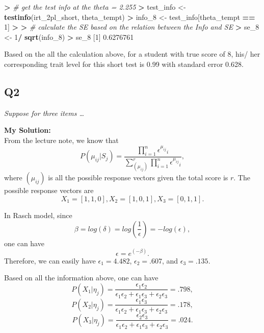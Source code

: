 \documentclass[
]{article}
\newenvironment{Shaded}{\begin{snugshade}}{\end{snugshade}}
\newcommand{\CommentTok}[1]{\textcolor[rgb]{0.56,0.35,0.01}{\textit{#1}}}
\newcommand{\DecValTok}[1]{\textcolor[rgb]{0.00,0.00,0.81}{#1}}
\newcommand{\ErrorTok}[1]{\textcolor[rgb]{0.64,0.00,0.00}{\textbf{#1}}}
\newcommand{\FloatTok}[1]{\textcolor[rgb]{0.00,0.00,0.81}{#1}}
\newcommand{\FunctionTok}[1]{\textcolor[rgb]{0.13,0.29,0.53}{\textbf{#1}}}
\newcommand{\NormalTok}[1]{#1}
\newcommand{\OtherTok}[1]{\textcolor[rgb]{0.56,0.35,0.01}{#1}}
\newcommand{\SpecialCharTok}[1]{\textcolor[rgb]{0.81,0.36,0.00}{\textbf{#1}}}
\begin{document}
\begin{Shaded}
\begin{Highlighting}[]
\SpecialCharTok{\textgreater{}} \CommentTok{\# get the test info at the theta = 2.255}
\ErrorTok{\textgreater{}}\NormalTok{ test\_info }\OtherTok{\textless{}{-}} \FunctionTok{testinfo}\NormalTok{(irt\_2pl\_short, theta\_tempt)}
\SpecialCharTok{\textgreater{}}\NormalTok{ info\_8 }\OtherTok{\textless{}{-}}\NormalTok{ test\_info[theta\_tempt }\SpecialCharTok{==} \DecValTok{1}\NormalTok{]}
\SpecialCharTok{\textgreater{}} 
\ErrorTok{\textgreater{}} \CommentTok{\# calculate the SE based on the relation between the Info and SE}
\ErrorTok{\textgreater{}}\NormalTok{ se\_8 }\OtherTok{\textless{}{-}} \DecValTok{1}\SpecialCharTok{/} \FunctionTok{sqrt}\NormalTok{(info\_8)}
\SpecialCharTok{\textgreater{}}\NormalTok{ se\_8}
\NormalTok{[}\DecValTok{1}\NormalTok{] }\FloatTok{0.6276761}
\end{Highlighting}
\end{Shaded}

Based on the all the calculation above, for a student with true score of
8, his/ her corresponding trait level for this short test is 0.99 with
standard error 0.628.

\hypertarget{q2}{%
\subsection{Q2}\label{q2}}

\emph{Suppose for three items \ldots{}}

\textbf{My Solution:}\\
From the lecture note, we know that
\[P(\mu_{ij}|S_j)=\frac{\prod_{i=1}^{n}{\epsilon^{\mu_{ij}}}_i}{\sum_{(\mu_{ij})}^{r}{\prod_{i=1}^{n}{\epsilon^{\mu_{ij}}}_i}},\]
where \((\mu_{ij})\) is all the possible response vectors given the
total score is \(r\). The possible response vectors are
\[X_1=[1,1,0], X_2=[1,0,1], X_3=[0,1,1].\]

In Rasch model, since
\[\beta = log(\delta) =log(\frac{1}{\epsilon})=-log(\epsilon), \] one
can have \[\epsilon=e^{(-\beta)}.\] Therefore, we can easily have
\(\epsilon_1 = 4.482\), \(\epsilon_2 = .607\), and
\(\epsilon_3 = .135\).

Based on all the information above, one can have
\[P(X_1|\eta_j)=\frac{\epsilon_1\epsilon_2}{\epsilon_1\epsilon_2+\epsilon_1\epsilon_3+\epsilon_2\epsilon_3}=.798,\]
\[P(X_2|\eta_j)=\frac{\epsilon_1\epsilon_3}{\epsilon_1\epsilon_2+\epsilon_1\epsilon_3+\epsilon_2\epsilon_3}=.178,\]
\[
P(X_3|\eta_j)=\frac{\epsilon_2\epsilon_3}{\epsilon_1\epsilon_2+\epsilon_1\epsilon_3+\epsilon_2\epsilon_3}=.024.\]
\end{document}
